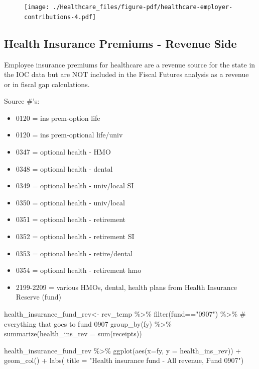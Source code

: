 \documentclass[
  letterpaper,
  DIV=11,
  numbers=noendperiod]{scrreport}
\newenvironment{Shaded}{\begin{snugshade}}{\end{snugshade}}
\newcommand{\AttributeTok}[1]{\textcolor[rgb]{0.40,0.45,0.13}{#1}}
\newcommand{\CommentTok}[1]{\textcolor[rgb]{0.37,0.37,0.37}{#1}}
\newcommand{\FunctionTok}[1]{\textcolor[rgb]{0.28,0.35,0.67}{#1}}
\newcommand{\NormalTok}[1]{\textcolor[rgb]{0.00,0.23,0.31}{#1}}
\newcommand{\OtherTok}[1]{\textcolor[rgb]{0.00,0.23,0.31}{#1}}
\newcommand{\SpecialCharTok}[1]{\textcolor[rgb]{0.37,0.37,0.37}{#1}}
\newcommand{\StringTok}[1]{\textcolor[rgb]{0.13,0.47,0.30}{#1}}
\providecommand{\tightlist}{%
  \setlength{\itemsep}{0pt}\setlength{\parskip}{0pt}}\usepackage{longtable,booktabs,array}
\begin{document}
\begin{figure}[H]

{\centering \texttt{[image: ./Healthcare\_files/figure-pdf/healthcare-employer-contributions-4.pdf]}

}

\end{figure}

\hypertarget{health-insurance-premiums---revenue-side}{%
\subsection{Health Insurance Premiums - Revenue
Side}\label{health-insurance-premiums---revenue-side}}

Employee insurance premiums for healthcare are a revenue source for the
state in the IOC data but are NOT included in the Fiscal Futures
analysis as a revenue or in fiscal gap calculations.

Source \#'s:

\begin{itemize}
\tightlist
\item
  0120 = ins prem-option life
\item
  0120 = ins prem-optional life/univ
\item
  0347 = optional health - HMO
\item
  0348 = optional health - dental
\item
  0349 = optional health - univ/local SI
\item
  0350 = optional health - univ/local
\item
  0351 = optional health - retirement
\item
  0352 = optional health - retirement SI
\item
  0353 = optional health - retire/dental
\item
  0354 = optional health - retirement hmo
\item
  2199-2209 = various HMOs, dental, health plans from Health Insurance
  Reserve (fund)
\end{itemize}

\begin{Shaded}
\begin{Highlighting}[]
\NormalTok{health\_insurance\_fund\_rev}\OtherTok{\textless{}{-}}\NormalTok{ rev\_temp }\SpecialCharTok{\%\textgreater{}\%} 
  \FunctionTok{filter}\NormalTok{(fund}\SpecialCharTok{==}\StringTok{"0907"}\NormalTok{) }\SpecialCharTok{\%\textgreater{}\%} \CommentTok{\# everything that goes to fund 0907}
    \FunctionTok{group\_by}\NormalTok{(fy) }\SpecialCharTok{\%\textgreater{}\%}
  \FunctionTok{summarize}\NormalTok{(}\AttributeTok{health\_ins\_rev =} \FunctionTok{sum}\NormalTok{(receipts)) }


\NormalTok{health\_insurance\_fund\_rev }\SpecialCharTok{\%\textgreater{}\%} 
  \FunctionTok{ggplot}\NormalTok{(}\FunctionTok{aes}\NormalTok{(}\AttributeTok{x=}\NormalTok{fy, }\AttributeTok{y =}\NormalTok{ health\_ins\_rev)) }\SpecialCharTok{+} 
  \FunctionTok{geom\_col}\NormalTok{() }\SpecialCharTok{+} \FunctionTok{labs}\NormalTok{( }\AttributeTok{title =} \StringTok{"Health insurance fund {-} All revenue, Fund 0907"}\NormalTok{)}
\end{Highlighting}
\end{Shaded}
\end{document}
